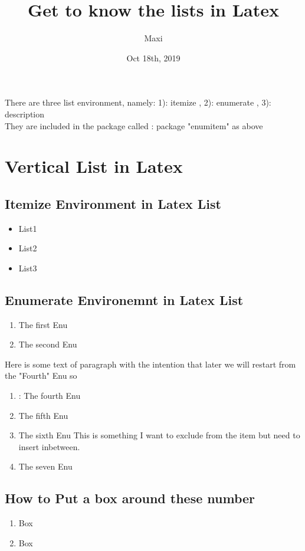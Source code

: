\documentclass[a4paper,12pt]{article}
\title{Get to know the lists in Latex}
\author{Maxi}
\date{Oct 18th, 2019}
\begin{document}
	\maketitle
	There are three list environment, namely: 1): itemize , 2): enumerate , 3): description \\
	They are included in the package called : package  "enumitem" as above 
	
	\section{Vertical List in Latex}
		\subsection{Itemize Environment in Latex List}
		
			\begin{itemize}[leftmargin=3in, label = $\ast$]
				\item List1
				\item List2
				\item List3
			\end{itemize}
		
		\subsection{Enumerate Environemnt in Latex List}
			\begin{enumerate}[label=\Roman*]   %
				\item The first Enu
				\item The second Enu
			\end{enumerate}
		
		Here is some text of paragraph with the intention that later we will restart from the "Fourth" Enu so
		
		\begin{enumerate}[resume,label=\Roman*]   %
			\item: The fourth Enu
			\item The fifth Enu
			\item The sixth Enu
			\subitem This is something I want to exclude from the item but need to insert inbetween.
			\item The seven Enu
		\end{enumerate}
	
	\subsection{How to Put a box around these number}
		\begin{enumerate}[label=\fbox{\arabic*}]
			\item Box
			\item Box
		\end{enumerate}
	
\end{document}
